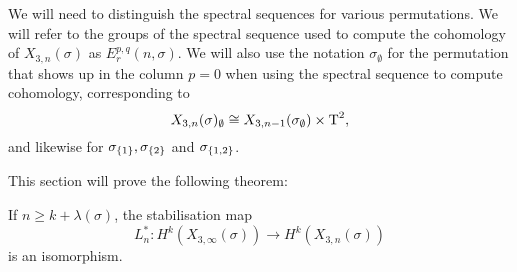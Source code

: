 We will need to distinguish the spectral sequences for various
permutations. We will refer to the groups of the spectral sequence
used to compute the cohomology of $X_{3,n}(\sigma)$ as
$E_r^{p,q}(n,\sigma)$. We will also use the notation
$\sigma_{\emptyset}$ for the permutation that shows up in the
column $p=0$ when using the spectral sequence to compute cohomology,
corresponding to
\[X_{3,n}(\sigma)_{\emptyset} \cong
X_{3,n-1}(\sigma_{\emptyset})\times \operatorname{T}^2,\]
and likewise for $\sigma_{\left\{ 1 \right\}},
\sigma_{\left\{ 2 \right\}}$ and $\sigma_{\left\{ 1,2 \right\}}$.

This section will prove the following theorem:
\begin{theorem}
  \label{thm:kostab}
  If $n \geq k + \lambda(\sigma)$, the stabilisation map
  \[ L_{n}^* : H^k(X_{3,\infty}(\sigma)) \to H^k(X_{3,n}(\sigma)) \]
  is an isomorphism.
\end{theorem}

